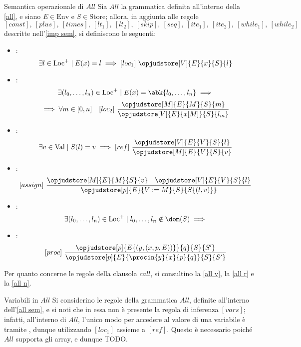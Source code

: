 \documentclass[a4paper, 12pt]{report}
\begin{document}
    \begin{framedprop}[label={all sem}, breakable]{Semantica operazionale di $All$}
        Sia $All$ la grammatica definita all'interno della \cref{all}, e siano $E \in \mathrm{Env}$ e $S \in \mathrm{Store}$; allora, in aggiunta alle regole $$[const], \ [plus], \ [times], \ [lt_1], \ [lt_2], \ [skip], \ [seq], \ [ite_1], \ [ite_2], \ [while_1], \ [while_2]$$ descritte nell'\cref{imp sem}, si definiscono le seguenti:

        \begin{itemize}
            \item {}: $$\exists l \in \mathrm{Loc}^+ \mid E(x) = l \implies [loc_1] \ \opjudstore[V]{E}{x}{S}{l}$$
            \item {}: $$\exists (l_0, \ldots, l_n) \in \mathrm{Loc}^+ \mid E(x) = \abk{l_0, \ldots, l_n} \implies$$ $$\implies \forall m \in [0, n] \quad [loc_2] \ \dfrac{\opjudstore[M]{E}{M}{S}{m}}{\opjudstore[V]{E}{x[M]}{S}{l_m}}$$
            \item {}: $$\exists v \in \mathrm{Val} \mid S(l) = v \implies [ref] \ \dfrac{\opjudstore[V]{E}{V}{S}{l}}{\opjudstore[M]{E}{V}{S}{v}}$$
            \item {}: $$[assign] \ \dfrac{\opjudstore[M]{E}{M}{S}{v} \quad \opjudstore[V]{E}{V}{S}{l}}{\opjudstore[p]{E}{V := M}{S}{S\{(l,v)\}}}$$
            \item {}: $$\exists (l_0, \ldots, l_n) \in \mathrm{Loc}^+ \mid l_0, \ldots, l_n \notin \dom(S) \implies$$ 
            \item {}: $$[proc] \ \dfrac{\opjudstore[p]{E\{(y,(x,p, E))\}}{q}{S}{S'}}{\opjudstore[p]{E}{\procin{y}{x}{p}{q}}{S}{S'}}$$
        \end{itemize}

        Per quanto concerne le regole della clausola $call$, si consultino la \cref{all v}, la \cref{all r} e la \cref{all n}.
    \end{framedprop}

    \begin{framedobs}{Variabili in $All$}
        Si considerino le regole della grammatica $All$, definite all'interno dell'\cref{all sem}, e si noti che in essa non è presente la regola di inferenza $[vars]$; infatti, all'interno di $All$, l'unico modo per accedere al valore di una variabile è tramite , dunque utilizzando $[loc_1]$ assieme a $[ref]$. Questo è necessario poiché $All$ supporta gli array, e dunque TODO.
    \end{framedobs}
\end{document}
